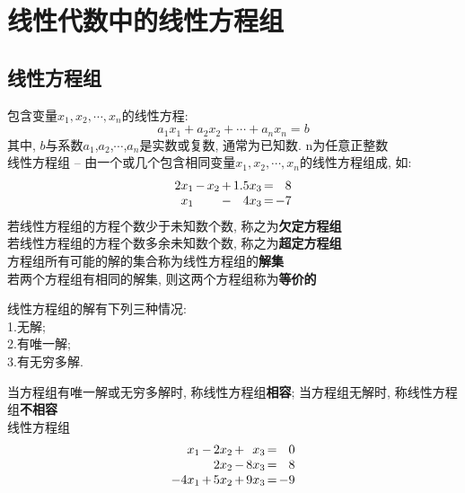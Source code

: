 \chapter{线性代数中的线性方程组}
\section{线性方程组}
包含变量$x_1,x_2,\cdots,x_n$的线性方程:
	\[ a_{1}x_{1}+a_{2}x_{2}+\cdots +a_{n}x_{n}=b \]
其中, $b$与系数$a_{1}$,$a_{2}$,$\cdots$,$a_{n}$是实数或复数, 通常为已知数. n为任意正整数\\[2ex]

线性方程组 -- 由一个或几个包含相同变量$x_1,x_2,\cdots,x_n$的线性方程组成, 如:
\[\begin{array}{r@{\hspace{1.5pt}}l@{\hspace{1.5pt}}r@{\hspace{1.5pt}}l@{\hspace{1.5pt}}r@{\hspace{1.5pt}}l@{\hspace{1.5pt}}r}
	2x_1 & - & x_2 & + & 1.5x_3 & = & 8\\
	x_1  &   &     & - & 4x_3   & = & -7		
\end{array}\]
若线性方程组的方程个数少于未知数个数, 称之为\textbf{欠定方程组}\\
若线性方程组的方程个数多余未知数个数, 称之为\textbf{超定方程组}\\[1ex]

方程组所有可能的解的集合称为线性方程组的\textbf{解集}\\
若两个方程组有相同的解集, 则这两个方程组称为\textbf{等价的}\\[2ex]

\begin{center}
\begin{boxedminipage}{8cm}
线性方程组的解有下列三种情况:\\
1.无解;\\
2.有唯一解;\\
3.有无穷多解.
\end{boxedminipage}
\end{center}\vspace{2ex}

当方程组有唯一解或无穷多解时, 称线性方程组\textbf{相容}; 当方程组无解时, 称线性方程组\textbf{不相容}\\[2ex]

线性方程组
\[\begin{array}{r@{\hspace{1.5pt}}l@{\hspace{1.5pt}}r@{\hspace{1.5pt}}l@{\hspace{1.5pt}}r@{\hspace{1.5pt}}l@{\hspace{1.5pt}}r}
x_1 & - & 2x_2 & + &  x_3 & = & 0\\
	& 	& 2x_2 & - & 8x_3 & = & 8\\
-4x_1 & + & 5x_2 & + & 9x_3 & = & -9
\end{array}\]

